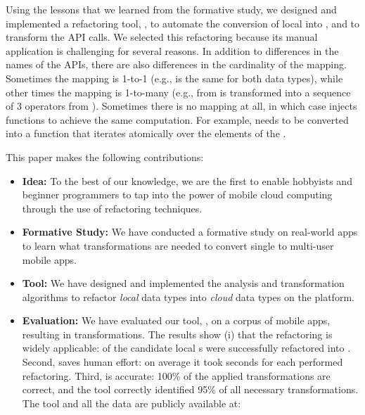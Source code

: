\documentclass[article]{sigplanconf}
\begin{document}
Using the lessons that we learned from the formative study, we designed and implemented a refactoring tool, \tool, to automate the conversion of local \NC{} into , and to transform the API calls. We selected this refactoring because its manual application is 
challenging for several reasons.
In addition to differences in the names of the APIs, there are also differences in the cardinality of the mapping.
Sometimes the mapping is 1-to-1 (e.g.,  is the same for both data types), while other times the mapping is 1-to-many (e.g.,  from  is transformed into a sequence of 3 operators from ). Sometimes there is no mapping at all, in which case \tool injects functions to achieve the same computation. For example,  needs to be converted into a function that iterates atomically over the elements of the . 

This paper makes the following contributions:
\begin{itemize}
\item{\textbf{Idea:}} To the best of our knowledge, we are the first to enable hobbyists and beginner programmers to tap into the power of mobile cloud
computing through the use of refactoring techniques.

\item{\textbf{Formative Study:}} We have conducted a formative study on \numFormative real-world apps to learn what transformations are needed to convert single to multi-user mobile apps. 

\item{\textbf{Tool:}} We have designed and implemented the analysis and transformation algorithms to refactor \emph{local} data types into \emph{cloud} data types on the \TD platform. 

\item{\textbf{Evaluation:}} We have evaluated our tool, \tool, on a corpus of \numScripts mobile apps, resulting in \numTransformations transformations. The results show (i) that the refactoring is widely applicable: \percentRefactored of the candidate local s were successfully refactored into . Second, \tool saves human effort: on average it took \numAVGSecs seconds for each performed refactoring. Third, \tool is  
accurate: 100\% of the applied transformations are correct, and the tool correctly identified 95\% of all necessary transformations.  The tool and all the data are publicly available at: \\

\end{itemize}
\end{document}
